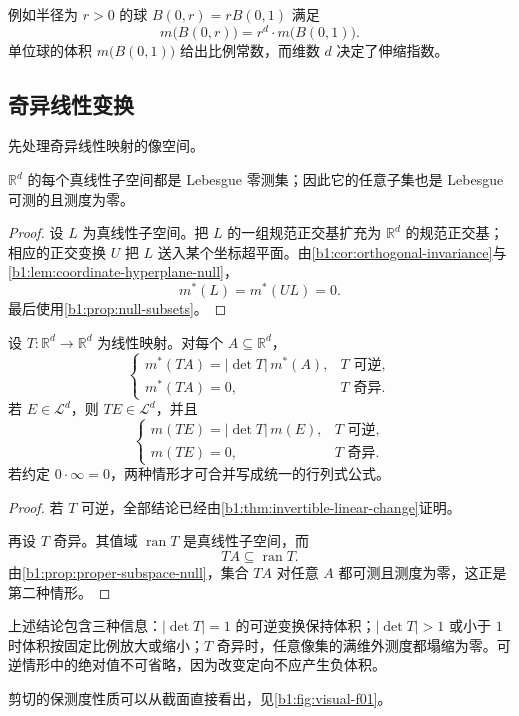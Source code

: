 例如半径为 \(r>0\) 的球 \(B(0,r)=rB(0,1)\) 满足
\[
m\bigl(B(0,r)\bigr)=r^d \cdot m\bigl(B(0,1)\bigr).
\]
单位球的体积 \(m\bigl(B(0,1)\bigr)\) 给出比例常数，而维数 \(d\) 决定了伸缩指数。

\subsection{奇异线性变换}
\label{b1:subsec:030404}

先处理奇异线性映射的像空间。

\begin{proposition}
\label{b1:prop:proper-subspace-null}
\(\mathbb R^d\) 的每个真线性子空间都是 Lebesgue 零测集；因此它的任意子集也是 Lebesgue 可测的且测度为零。
\end{proposition}
\begin{proof}
设 \(L\) 为真线性子空间。把 \(L\) 的一组规范正交基扩充为 \(\mathbb R^d\) 的规范正交基；相应的正交变换 \(U\) 把 \(L\) 送入某个坐标超平面。由\cref{b1:cor:orthogonal-invariance}与\cref{b1:lem:coordinate-hyperplane-null}，
\[
m^*(L)=m^*(UL)=0.
\]
最后使用\cref{b1:prop:null-subsets}。
\end{proof}

\begin{theorem}
\label{b1:thm:linear-change}
设 \(T:\mathbb R^d\to\mathbb R^d\) 为线性映射。对每个 \(A\subseteq\mathbb R^d\)，
\[
\begin{cases}
m^*(TA)=|\det T|\,m^*(A),&T\text{ 可逆},\\
m^*(TA)=0,&T\text{ 奇异}.
\end{cases}
\]
若 \(E\in\mathcal L^d\)，则 \(TE\in\mathcal L^d\)，并且
\[
\begin{cases}
m(TE)=|\det T|\,m(E),&T\text{ 可逆},\\
m(TE)=0,&T\text{ 奇异}.
\end{cases}
\]
若约定 \(0\cdot\infty=0\)，两种情形才可合并写成统一的行列式公式。
\end{theorem}
\begin{proof}
若 \(T\) 可逆，全部结论已经由\cref{b1:thm:invertible-linear-change}证明。

再设 \(T\) 奇异。其值域 \(\operatorname{ran}T\) 是真线性子空间，而
\[
TA\subseteq\operatorname{ran}T.
\]
由\cref{b1:prop:proper-subspace-null}，集合 \(TA\) 对任意 \(A\) 都可测且测度为零，这正是第二种情形。
\end{proof}

上述结论包含三种信息：\(|\det T|=1\) 的可逆变换保持体积；\(|\det T|>1\) 或小于 \(1\) 时体积按固定比例放大或缩小；\(T\) 奇异时，任意像集的满维外测度都塌缩为零。可逆情形中的绝对值不可省略，因为改变定向不应产生负体积。

剪切的保测度性质可以从截面直接看出，见\cref{b1:fig:visual-f01}。

